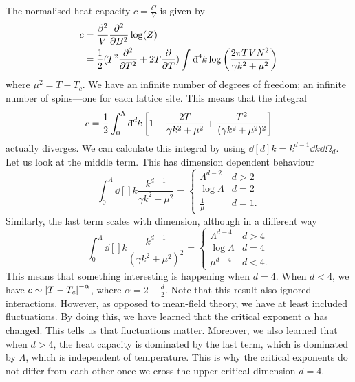 The normalised heat capacity $c = \frac{C}{V}$ is given by
\begin{align}
  c &= \frac{\beta^2}{V} \pdv[2]{}{B} \log(Z) \\
    &=\frac{1}{2} (T^2 \pdv[2]{}{T} + 2 T \pdv{}{T}) \int_{}^{} \bdd[4]{k} \log \left( \frac{2\pi T V N^2}{\gamma k^2 + \mu^2} \right)
\end{align}
where $\mu^2 = T - T_c$.
We have an infinite number of degrees of freedom; an infinite number of spins---one for each lattice site. This means that the integral
\begin{equation}
  c = \frac{1}{2} \int_{0}^{\Lambda} \bdd[d]{k} \left[ 1  - \frac{2 T}{\gamma k^2 + \mu^2} + \frac{T^2}{(\gamma k^2 + \mu^2)^2} \right]
\end{equation}
actually diverges. We can calculate this integral by using $\dd[d]{k} = k^{d-1} \dd{k} \dd{\Omega}_d$.
Let us look at the middle term. This has dimension dependent behaviour
\begin{equation}
  \int_{0}^{\Lambda} \dd[]{k} \frac{k^{d-1}}{\gamma k^2 + \mu^2} = 
  \begin{cases}
    \Lambda^{d-2} & d > 2 \\
    \log \Lambda & d = 2 \\
    \frac{1}{\mu} & d = 1.
  \end{cases}
\end{equation}
Similarly, the last term scales with dimension, although in a different way
\begin{equation}
  \int_{0}^{\Lambda} \dd[]{k} \frac{k^{d-1}}{(\gamma k^2 + \mu^2)^2} = 
  \begin{cases}
    \Lambda^{d-4} & d > 4 \\
    \log \Lambda & d = 4 \\
    \mu^{d-4} & d < 4.
  \end{cases}
\end{equation}
This means that something interesting is happening when $d = 4$. When $d < 4$, we have $c \sim \abs{T- T_c}^{-\alpha}$, where $\alpha = 2 - \frac{d}{2}$.
Note that this result also ignored interactions. However, as opposed to mean-field theory, we have at least included fluctuations. By doing this, we have learned that the critical exponent $\alpha$ has changed.
This tells us that fluctuations matter.
Moreover, we also learned that when $d > 4$, the heat capacity is dominated by the last term, which is dominated by $\Lambda$, which is independent of temperature. This is why the critical exponents do not differ from each other once we cross the upper critical dimension $d = 4$.

